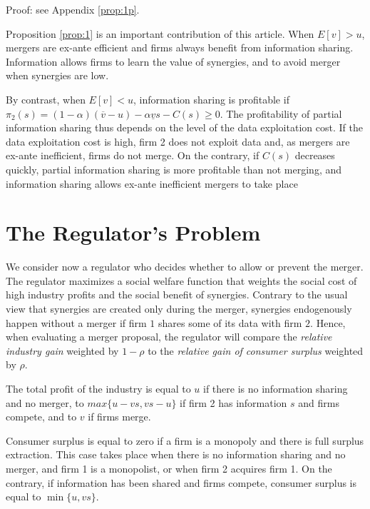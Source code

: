 \documentclass[a4paper,leqno]{article}%
\renewcommand{\a}{\alpha}
\newcommand{\uv}{\underline{v}}
\newcommand{\ov}{\overline{v}}
\begin{document}
\noindent Proof: see Appendix \ref{prop:1p}.

\medskip

\noindent Proposition \ref{prop:1} is an important contribution of this article. When $E[v]>u$, mergers are ex-ante efficient and firms always benefit from information sharing. Information allows firms to learn the value of synergies, and to avoid merger when synergies are low. 

\medskip

By contrast, when $E[v]<u$, information sharing is profitable if $\pi_2(s)=(1-\a)(\ov -u)-\a \uv s-C(s)\geq0$. The profitability of partial information sharing thus depends on the level of the data exploitation cost. If the data exploitation cost is high, firm 2 does not exploit data and, as mergers are ex-ante inefficient, firms do not merge. On the contrary, if $C(s)$ decreases quickly, partial information sharing is more profitable than not merging, and information sharing allows ex-ante inefficient mergers to take place

\medskip


\section{The Regulator's Problem}\label{regul}

We consider now a regulator who decides whether to allow or prevent the merger. The regulator maximizes a social welfare function that weights the social cost of high industry profits and the social benefit of synergies. Contrary to the usual view that synergies are created only during the merger, synergies endogenously happen without a merger if firm $1$ shares some of its data with firm $2$. Hence, when evaluating a merger proposal, the regulator will compare the \emph{relative industry gain} weighted by $1-\rho$ to the \emph{relative gain of consumer surplus} weighted by $\rho$.

\medskip

The total profit of the industry is equal to $u$ if there is no information sharing and no merger, to $max\{u-v s,v s-u\}$ if firm 2 has information $s$ and firms compete, and to $v$ if firms merge.

\medskip

Consumer surplus is equal to zero if a firm is a monopoly and there is full surplus extraction. This case takes place when there is no information sharing and no merger, and firm 1 is a monopolist, or when firm 2 acquires firm 1. On the contrary, if information has been shared and firms compete, consumer surplus is equal to $\min\{u,v s\}$.
\end{document}
